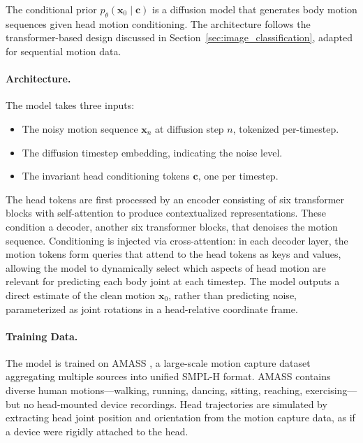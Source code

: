 The conditional prior $p_\theta(\boldsymbol{x}_0 \mid \boldsymbol{c})$ is a
diffusion model that generates body motion sequences given head
motion conditioning. The architecture follows the transformer-based
design discussed in Section~\ref{sec:image_classification}, adapted
for sequential motion data.

\paragraph{Architecture.}
The model takes three inputs:
\begin{itemize}
    \item The noisy motion sequence $\boldsymbol{x}_n$ at diffusion step
        $n$, tokenized per-timestep.
    \item The diffusion timestep embedding, indicating the noise level.
    \item The invariant head conditioning tokens $\boldsymbol{c}$, one per timestep.
\end{itemize}

The head tokens are first processed by an encoder consisting of six
transformer blocks with self-attention to produce contextualized
representations. These condition a decoder, another six transformer
blocks, that denoises the motion sequence. Conditioning is injected
via cross-attention: in each decoder layer, the motion tokens form
queries that attend to the head tokens as keys and values, allowing
the model to dynamically select which aspects of head motion are
relevant for predicting each body joint at each timestep. The model
outputs a direct estimate of the clean motion $\boldsymbol{x}_0$, rather
than predicting noise, parameterized as joint rotations in a
head-relative coordinate frame.

\paragraph{Training Data.}
The model is trained on AMASS \citep{mahmood2019amass}, a large-scale
motion capture dataset aggregating multiple sources into unified
SMPL-H format. AMASS contains diverse human motions---walking,
running, dancing, sitting, reaching, exercising---but no head-mounted
device recordings. Head trajectories are simulated by extracting head
joint position and orientation from the motion capture data, as if a
device were rigidly attached to the head.

